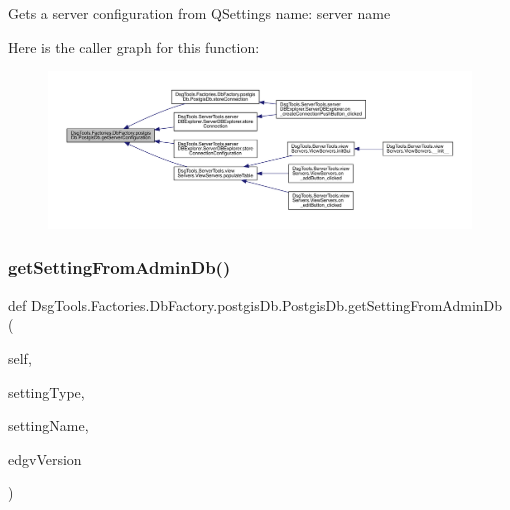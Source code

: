 \begin{DoxyVerb}Gets a server configuration from QSettings
name: server name
\end{DoxyVerb}
 Here is the caller graph for this function\+:
\nopagebreak
\begin{figure}[H]
\begin{center}
\leavevmode
\includegraphics[width=350pt]{class_dsg_tools_1_1_factories_1_1_db_factory_1_1postgis_db_1_1_postgis_db_a8860ba56c1bcb5721a2130b1c7530104_icgraph}
\end{center}
\end{figure}
\mbox{\label{class_dsg_tools_1_1_factories_1_1_db_factory_1_1postgis_db_1_1_postgis_db_aa1c8e310a041de3d41cab1aad19845e2}} 
\subsubsection{\texorpdfstring{get\+Setting\+From\+Admin\+Db()}{getSettingFromAdminDb()}}
{\footnotesize\ttfamily def Dsg\+Tools.\+Factories.\+Db\+Factory.\+postgis\+Db.\+Postgis\+Db.\+get\+Setting\+From\+Admin\+Db (\begin{DoxyParamCaption}\item[{}]{self,  }\item[{}]{setting\+Type,  }\item[{}]{setting\+Name,  }\item[{}]{edgv\+Version }\end{DoxyParamCaption})}

